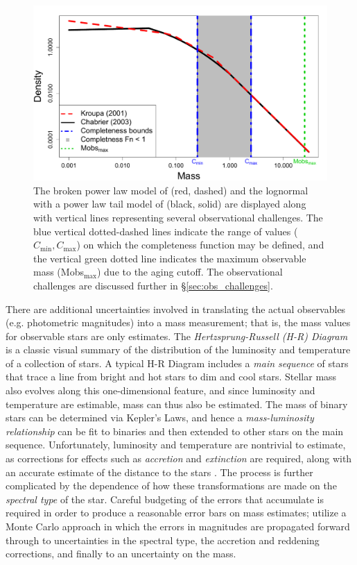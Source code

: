 \documentclass[ejs]{imsart}
\numberwithin{equation}{section}
\theoremstyle{plain}
\begin{document}
\begin{figure}[htbp]
   \centering
\includegraphics[width = .5\textwidth]{figures/CompareOthers3.pdf} 
   \caption{The broken power law model of \cite{kroupa2001} (red, dashed) and the lognormal with a power law tail model of \cite{Chabrier:2003om, Chabrier:2003oq} (black, solid) are displayed along with vertical lines representing several observational challenges.  The blue vertical dotted-dashed lines indicate the range of values ($C_{\min}, C_{\max}$) on which the completeness function may be defined, and the vertical green dotted line indicates the maximum observable mass (Mobs$_{\max}$) due to the aging cutoff.  The observational challenges are discussed further in \S\ref{sec:obs_challenges}.}
   \label{fig:imf_models}
\end{figure}


There are additional uncertainties involved in translating the actual observables  (e.g. photometric magnitudes) into a mass measurement; that is, the mass values for observable stars are only estimates. The {\it Hertzsprung-Russell (H-R) Diagram} is a classic visual summary of the distribution of the luminosity and temperature of a collection of stars. A typical H-R Diagram includes a {\it main sequence} of stars that trace a line from bright and hot stars to dim and cool stars. Stellar mass also evolves along this one-dimensional feature, and since luminosity and temperature are estimable, mass can thus also be estimated. The mass of binary stars can be determined via Kepler's Laws, and hence a {\it mass-luminosity relationship} can be fit to binaries and then extended to other stars on the main sequence. Unfortunately, luminosity and temperature are nontrivial to estimate, as corrections for effects such as {\it accretion} and {\it extinction} are required, along with an accurate estimate of the distance to the stars \citep{Da-Rio:2010aa}. 
The process is further complicated by the dependence of how these transformations are made on the {\it spectral type} of the star. Careful budgeting of the errors that accumulate is required in order to produce a reasonable error bars on mass estimates; \cite{Da-Rio:2010aa} utilize a Monte Carlo approach in which the errors in magnitudes are propagated forward through to uncertainties in the spectral type, the accretion and reddening corrections, and finally to an uncertainty on the mass.  
\end{document}
